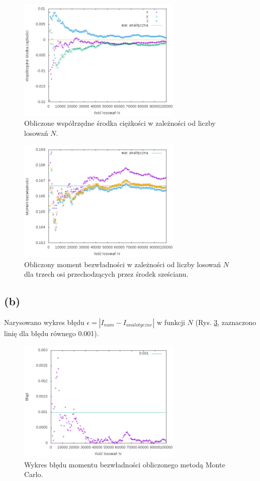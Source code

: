 \documentclass[11pt]{article}
\begin{document}
\begin{figure} 
\centering
\includegraphics[width=0.7\textwidth]{CM1.png}
\caption{Obliczone współrzędne środka ciężkości w zależności od liczby losowań $N$.}\label{fig:11}
\end{figure}
\begin{figure} 
\centering
\includegraphics[width=0.7\textwidth]{EI.png}
\caption{Obliczony moment bezwładności w zależności od liczby losowań $N$ dla trzech osi przechodzących 
przez środek sześcianu.}\label{fig:22}
\end{figure}
\subsection*{(b)}
Narysowano wykres błędu $\epsilon = | I_{num} - I_{analotyczne} |$ 
w funkcji $N$ (Rys. \ref{fig:1}, zaznaczono linię dla błędu równego 0.001).
\begin{figure} 
\centering
\includegraphics[width=0.7\textwidth]{ERR3.png}
\caption{Wykres błędu momentu bezwładności obliczonego metodą Monte Carlo.}\label{fig:1}
\end{figure}
\end{document}
